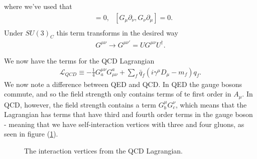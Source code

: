 \documentclass[11pt]{article}
\begin{document}
\begin{multicols}{2}
\begin{flushleft}
where we've used that
\begin{align*}
[\partial_{\mu}, \partial_{\nu}] &= 0, \text{ } [G_{\mu} \partial_{\nu}, G_{\nu} \partial_{\mu}]=0.\\
\end{align*}
Under $SU(3)_C$ this term transforms in the desired way
\begin{align*}
G^{\mu \nu} \rightarrow G^{\mu \nu '} = U G^{\mu \nu} U^{\dagger}.
\end{align*}
\end{flushleft}

\begin{flushleft}
We now have the terms for the QCD Lagrangian 
\begin{align}
\mathcal{L}_{QCD} \equiv - \frac{1}{4} G^{\mu \nu}_a G^a_{\mu \nu} + \sum_f \bar{q}_f (i \gamma^{\mu} D_{\mu} -m_f)q_f.
\end{align}
We now note a difference between QED and QCD. In QED the gauge bosons commute, and so the field strength only contains terms of te first order in $A_{\mu}$. In QCD, however, the field strength contains a term $G^{\mu}_b G^{\nu}_c$, which means that the Lagrangian has terms that have third and fourth order terms in the gauge boson - meaning that we have self-interaction vertices with three and four gluons, as seen in figure (\ref{QCD vertices}).
 
\begin{figure}[H]
\caption{The interaction vertices from the QCD Lagrangian.}
\label{QCD vertices}
\end{figure}
\end{flushleft}


\end{multicols}
\end{document}
